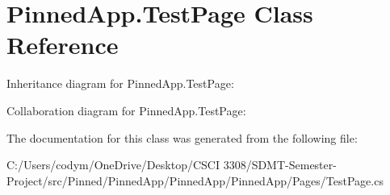 \hypertarget{class_pinned_app_1_1_test_page}{}\section{Pinned\+App.\+Test\+Page Class Reference}
\label{class_pinned_app_1_1_test_page}


Inheritance diagram for Pinned\+App.\+Test\+Page\+:


Collaboration diagram for Pinned\+App.\+Test\+Page\+:


The documentation for this class was generated from the following file\+:\begin{DoxyCompactItemize}
\item 
C\+:/\+Users/codym/\+One\+Drive/\+Desktop/\+C\+S\+C\+I 3308/\+S\+D\+M\+T-\/\+Semester-\/\+Project/src/\+Pinned/\+Pinned\+App/\+Pinned\+App/\+Pinned\+App/\+Pages/Test\+Page.\+cs\end{DoxyCompactItemize}

